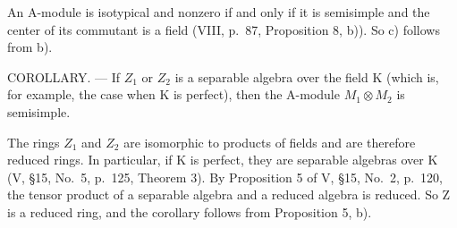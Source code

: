An A-module is isotypical and nonzero if and only if it is semisimple and the center of its commutant is a field (VIII, p.~87, Proposition 8, b)). So c) follows from b).

COROLLARY. --- If \(Z_{1}\) or \(Z_{2}\) is a separable algebra over the field K (which is, for example, the case when K is perfect), then the A-module \(M_{1} \otimes M_{2}\) is semisimple.

The rings \(Z_{1}\) and \(Z_{2}\) are isomorphic to products of fields and are therefore reduced rings. In particular, if K is perfect, they are separable algebras over K (V, §15, No.~5, p.~125, Theorem 3). By Proposition 5 of V, §15, No.~2, p.~120, the tensor product of a separable algebra and a reduced algebra is reduced. So Z is a reduced ring, and the corollary follows from Proposition 5, b).

